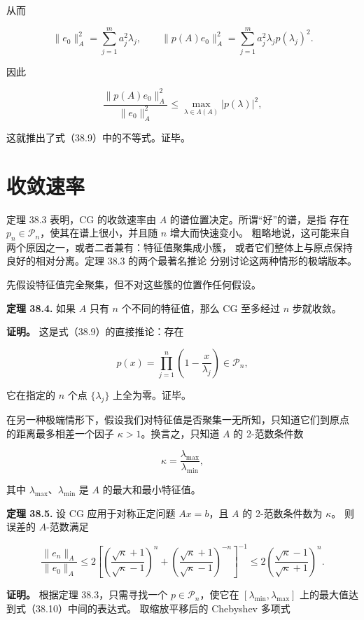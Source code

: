 \documentclass[UTF8,fontset=none,12pt]{ctexart}
\begin{document}
从而

\[
\lVert e_0\rVert_A^2=\sum_{j=1}^m a_j^2\lambda_j,\qquad
\lVert p(A)e_0\rVert_A^2
=\sum_{j=1}^m a_j^2\lambda_jp(\lambda_j)^2.
\]

因此

\[
\frac{\lVert p(A)e_0\rVert_A^2}{\lVert e_0\rVert_A^2}
\leq\max_{\lambda\in\Lambda(A)}|p(\lambda)|^2,
\]

这就推出了式（38.9）中的不等式。证毕。

\section*{收敛速率}

定理 38.3 表明，CG 的收敛速率由 $A$ 的谱位置决定。所谓“好”的谱，是指
存在 $p_n\in\mathcal P_n$，使其在谱上很小，并且随 $n$ 增大而快速变小。
粗略地说，这可能来自两个原因之一，或者二者兼有：特征值聚集成小簇，
或者它们整体上与原点保持良好的相对分离。定理 38.3 的两个最著名推论
分别讨论这两种情形的极端版本。

先假设特征值完全聚集，但不对这些簇的位置作任何假设。

\textbf{定理 38.4.}
如果 $A$ 只有 $n$ 个不同的特征值，那么 CG 至多经过 $n$ 步就收敛。

\textbf{证明。}
这是式（38.9）的直接推论：存在

\[
p(x)=\prod_{j=1}^{n}\left(1-\frac{x}{\lambda_j}\right)\in\mathcal P_n,
\]

它在指定的 $n$ 个点 $\{\lambda_j\}$ 上全为零。证毕。

在另一种极端情形下，假设我们对特征值是否聚集一无所知，只知道它们到原点
的距离最多相差一个因子 $\kappa>1$。换言之，只知道 $A$ 的 2-范数条件数

\[
\kappa=\frac{\lambda_{\max}}{\lambda_{\min}},
\]

其中 $\lambda_{\max}$、$\lambda_{\min}$ 是 $A$ 的最大和最小特征值。

\textbf{定理 38.5.}
设 CG 应用于对称正定问题 $Ax=b$，且 $A$ 的 2-范数条件数为 $\kappa$。
则误差的 $A$-范数满足

\begin{equation}
\frac{\lVert e_n\rVert_A}{\lVert e_0\rVert_A}
\leq
2\left[
\left(\frac{\sqrt\kappa+1}{\sqrt\kappa-1}\right)^n+
\left(\frac{\sqrt\kappa+1}{\sqrt\kappa-1}\right)^{-n}
\right]^{-1}
\leq
2\left(\frac{\sqrt\kappa-1}{\sqrt\kappa+1}\right)^n.
\tag{38.10}
\end{equation}

\textbf{证明。}
根据定理 38.3，只需寻找一个 $p\in\mathcal P_n$，使它在
$[\lambda_{\min},\lambda_{\max}]$ 上的最大值达到式（38.10）中间的表达式。
取缩放平移后的 Chebyshev 多项式
\end{document}
